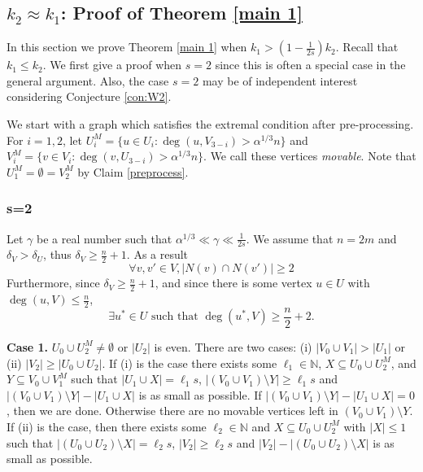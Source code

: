 \documentclass[oneside,12pt]{memoir}
\begin{document}
\subsection{$k_2\approx k_1$: Proof of Theorem \ref{main 1}}

In this section we prove Theorem \ref{main 1} when $k_1> (1-\frac{1}{2s})k_2$.  Recall that $k_1\leq k_2$.  We first give a proof when $s=2$ since this is often a special case in the general argument.  Also, the case $s=2$ may be of independent interest considering Conjecture \ref{con:W2}.

We start with a graph which satisfies the extremal condition after pre-processing.  For $i=1,2$, let $U_i^M=\{u\in U_i:\deg(u, V_{3-i})>\alpha^{1/3}n\}$ and $V_i^M=\{v\in V_i: \deg(v, U_{3-i})>\alpha^{1/3}n \}$.  We call these vertices \emph{movable}.  Note that $U_1^M=\emptyset=V_2^M$ by Claim \ref{preprocess}.

\subsubsection*{s=2}
Let $\gamma$ be a real number such that $\alpha^{1/3}\ll \gamma\ll \frac{1}{2s}$.  We assume that $n=2m$ and $\delta_V>\delta_U$, thus $\delta_V \geq \frac{n}{2}+1$. As a result
\begin{equation}\label{twocommon}
\forall v, v'\in V, |N(v)\cap N(v')|\geq 2
\end{equation}
Furthermore, since $\delta_V\geq \frac{n}{2}+1$, and since there is some vertex $u\in U$ with $\deg(u, V)\leq \frac{n}{2}$, 
\begin{equation}\label{u*}
\exists u^* \in U \mbox{ such that } \deg(u^*, V)\geq \frac{n}{2}+2.  
\end{equation}

\noindent
\textbf{Case 1.} $U_0\cup U_2^M\neq \emptyset$ or $|U_2|$ is even.  There are two cases: (i) $|V_0\cup V_1|>|U_1|$ 
or (ii) $|V_2|\geq |U_0\cup U_2|$.  If (i) is the case 
there exists some $\ell_1\in \mathbb{N}$, $X\subseteq U_0\cup U_2^M$, and $Y\subseteq V_0\cup V_1^M$ such that $|U_1\cup X|=\ell_1s$, $|(V_0\cup V_1)\setminus Y|\geq \ell_1s$ and $|(V_0\cup V_1)\setminus Y|-|U_1\cup X|$ is as small as possible.  If $|(V_0\cup V_1)\setminus Y|-|U_1\cup X|=0$, then we are done.  Otherwise there are no movable vertices left in $(V_0\cup V_1)\setminus Y$.   If (ii) is the case, then there exists some $\ell_2\in \mathbb{N}$ and $X\subseteq U_0\cup U_2^M$ with $|X|\leq 1$ such that $|(U_0\cup U_2)\setminus X|=\ell_2s$, $|V_2|\geq \ell_2s$ and $|V_2|-|(U_0\cup U_2)\setminus X|$ is as small as possible.
\end{document}
